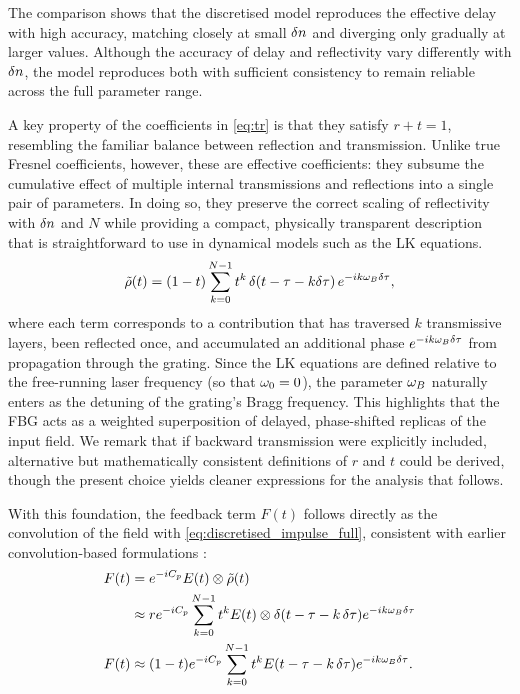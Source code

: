 The comparison shows that the discretised model reproduces the effective delay with high accuracy, matching closely at small $\delta n$ and diverging only gradually at larger values.
Although the accuracy of delay and reflectivity vary differently with $\delta n$, the model reproduces both with sufficient consistency to remain reliable across the full parameter range.
%
\par
%
A key property of the coefficients in \eqref{eq:tr} is that they satisfy $r+t=1$, resembling the familiar balance between reflection and transmission.
Unlike true Fresnel coefficients, however, these are effective coefficients: they subsume the cumulative effect of multiple internal transmissions and reflections into a single pair of parameters.
In doing so, they preserve the correct scaling of reflectivity with $\delta n$ and $N$ while providing a compact, physically transparent description that is straightforward to use in dynamical models such as the LK equations.
%
\begin{equation}
    \label{eq:discretised_impulse_full}
    \tilde{\rho}(t) = (1-t)\sum_{k=0}^{N-1} t^k \, \delta(t-\tau-k\delta \tau)\, e^{-i k \omega_B \delta \tau},
\end{equation}
%
where each term corresponds to a contribution that has traversed $k$ transmissive layers, been reflected once, and accumulated an additional phase $e^{-i k \omega_B \delta \tau}$ from propagation through the grating.
Since the LK equations are defined relative to the free-running laser frequency (so that $\omega_0=0$), the parameter $\omega_B$ naturally enters as the detuning of the grating's Bragg frequency.
This highlights that the FBG acts as a weighted superposition of delayed, phase-shifted replicas of the input field.
We remark that if backward transmission were explicitly included, alternative but mathematically consistent definitions of $r$ and $t$ could be derived, though the present choice yields cleaner expressions for the analysis that follows.
%
\par
%
With this foundation, the feedback term $F(t)$ follows directly as the convolution of the field with \eqref{eq:discretised_impulse_full}, consistent with earlier convolution-based formulations \cite{skenderas2024impact,skenderas2021feedback,li2012distributed,li2015chaotic,li2020stable}:
%
\begin{align*}
F(t) &= e^{-i C_p} E(t) \otimes \tilde{\rho}(t) \\
&\approx r e^{-i C_p} \sum_{k=0}^{N-1} t^k E(t) \otimes \delta(t-\tau-k\,\delta \tau) e^{-i k \omega_B \delta \tau} \\
F(t) &\approx (1-t) e^{-i C_p} \sum_{k=0}^{N-1} t^k E(t-\tau-k\,\delta \tau) e^{-i k \omega_B \delta \tau}.
\end{align*}
